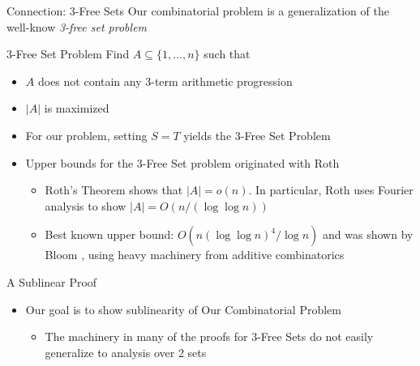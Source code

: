 \begin{frame}{Connection: 3-Free Sets}
Our combinatorial problem is a generalization of the well-know \textit{3-free set problem}

\begin{block}{3-Free Set Problem}
	Find $A \subseteq \{1,\dotsc,n\}$ such that
	\begin{itemize}
		\item $A$ does not contain any 3-term arithmetic progression
		\item $|A|$ is maximized
	\end{itemize}
\end{block}
\begin{itemize}
	\item<2-> For our problem, setting $S = T$ yields the 3-Free Set Problem
	\item<3-> Upper bounds for the 3-Free Set problem originated with Roth \cite{Roth53}
	\begin{itemize}
		\item Roth's Theorem shows that $|A| = o(n)$. In particular, Roth uses Fourier analysis to show $|A| = O(n / (\log \log n))$
		\item Best known upper bound: $O(n(\log \log n)^4 / \log n)$ and was shown by Bloom \cite{Bloom16}, using heavy machinery from additive combinatorics
	\end{itemize}
\end{itemize}
\end{frame}

\begin{frame}{A Sublinear Proof}

\begin{itemize}
	\item Our goal is to show sublinearity of Our Combinatorial Problem
	\begin{itemize}
		\item The machinery in many of the proofs for 3-Free Sets do not easily generalize to analysis over 2 sets 
	\end{itemize}
\end{itemize}




\end{frame}


